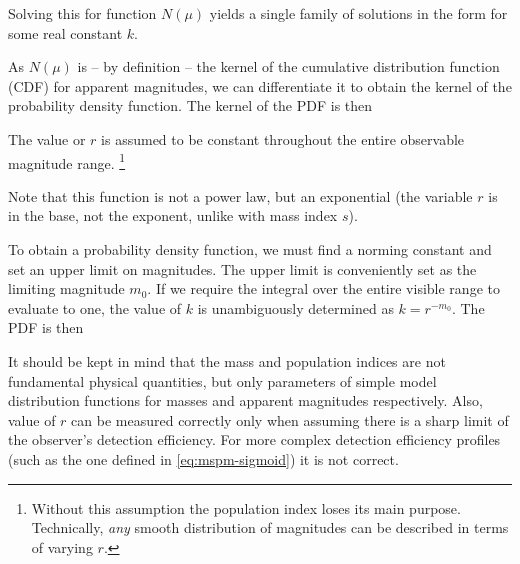             Solving this for function $N(\mu)$ yields a single family of solutions
            in the form
            for some real constant $k$.

            As $N(\mu)$ is -- by definition -- the kernel of the
            cumulative distribution function (CDF) for apparent magnitudes, we can differentiate it
            to obtain the kernel of the probability density function. The kernel of the PDF is then

            The value or $r$ is assumed to be constant throughout the entire observable magnitude range.%
            \footnote{Without this assumption the population index loses its main purpose.
            Technically, \emph{any} smooth distribution of magnitudes can be described in terms of varying $r$.}

            Note that this function is not a power law, but an exponential (the variable $r$
            is in the base, not the exponent, unlike with mass index $s$).

            To obtain a probability density function, we must find a norming constant
            and set an upper limit on magnitudes. The upper limit is conveniently set as the limiting
            magnitude $m_0$. If we require the integral over the entire visible range to evaluate to one,
            the value of $k$ is unambiguously determined as $k = r^{-m_0}$.
            The PDF is then

            It should be kept in mind that the mass and population indices are not fundamental physical quantities,
            but only parameters of simple model distribution functions for masses and apparent magnitudes respectively.
            Also, value of $r$ can be measured correctly only when assuming there is a sharp limit of the observer's detection efficiency.
            For more complex detection efficiency profiles (such as the one defined in \cref{eq:mspm-sigmoid}) it
            is not correct.




